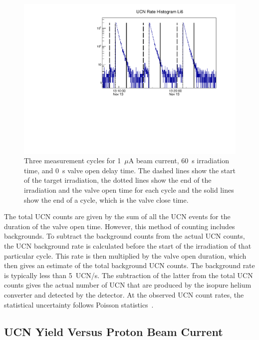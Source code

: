 \begin{figure}[h!]
  \centering
  \includegraphics[width=1.0\textwidth]{UCNRate_with_lines_logy.pdf}
  \caption[UCN cycles of measurement]{Three measurement cycles for
    1~$\mu$A beam current, 60~s irradiation time, and 0~s valve open
    delay time. The dashed lines show the start of the target
    irradiation, the dotted lines show the end of the irradiation and
    the valve open time for each cycle and the solid lines show the
    end of a cycle, which is the valve close time.}
  \label{fig:UCNRate_with_lines}
\end{figure}

The total UCN counts are given by the sum of all the UCN events for
the duration of the valve open time. However, this method of counting
includes backgrounds. To subtract the background counts from the
actual UCN counts, the UCN background rate is calculated before the
start of the irradiation of that particular cycle. This rate is then
multiplied by the valve open duration, which then gives an estimate of
the total background UCN counts. The background rate is typically less
than 5~UCN/s. The subtraction of the latter from the total UCN counts
gives the actual number of UCN that are produced by the isopure helium
converter and detected by the detector.  At the observed UCN count
rates, the statistical uncertainty follows Poisson
statistics~\cite{pomme2015uncertainty}.
\subsection{UCN Yield Versus Proton Beam Current}

